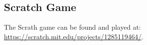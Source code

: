 ﻿\subsection{Scratch Game}
The Scrath game can be found and played at: \url{https://scratch.mit.edu/projects/1285119464/}.